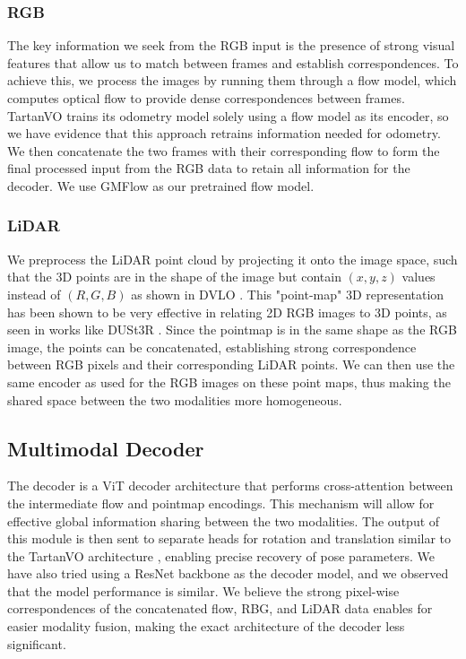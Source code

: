 \documentclass[11pt,a4paper]{article}
\begin{document}
\subsubsection{RGB}
The key information we seek from the RGB input is the presence of strong visual features that allow us to match between frames and establish correspondences. To achieve this, we process the images by running them through a flow model, which computes optical flow to provide dense correspondences between frames. TartanVO trains its odometry model solely using a flow model as its encoder, so we have evidence that this approach retrains information needed for odometry. We then concatenate the two frames with their corresponding flow to form the final processed input from the RGB data to retain all information for the decoder. We use GMFlow \cite{gmflow} as our pretrained flow model.

\subsubsection{LiDAR}
We preprocess the LiDAR point cloud by projecting it onto the image space, such that the 3D points are in the shape of the image but contain $(x,y,z)$ values instead of $(R, G, B)$ as shown in DVLO \cite{dvlo}. This "point-map" 3D representation has been shown to be very effective in relating 2D RGB images to 3D points, as seen in works like DUSt3R \cite{dust3r}. Since the pointmap is in the same shape as the RGB image, the points can be concatenated, establishing strong correspondence between RGB pixels and their corresponding LiDAR points. We can then use the same encoder as used for the RGB images on these point maps, thus making the shared space between the two modalities more homogeneous.

\subsection{Multimodal Decoder}
The decoder is a ViT decoder architecture that performs cross-attention between the intermediate flow and pointmap encodings. This mechanism will allow for effective global information sharing between the two modalities. The output of this module is then sent to separate heads for rotation and translation similar to the TartanVO architecture \cite{tartanvo}, enabling precise recovery of pose parameters. We have also tried using a ResNet backbone as the decoder model, and we observed that the model performance is similar. We believe the strong pixel-wise correspondences of the concatenated flow, RBG, and LiDAR data enables for easier modality fusion, making the exact architecture of the decoder less significant.
\end{document}
